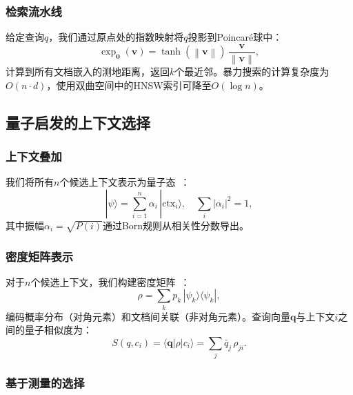 \documentclass[a4paper,11pt]{ctexart}
\newcommand{\norm}[1]{\left\|#1\right\|}
\newcommand{\abs}[1]{\left|#1\right|}
\newcommand{\ket}[1]{|#1\rangle}
\newcommand{\bra}[1]{\langle #1|}
\begin{document}
\subsubsection{检索流水线}

给定查询$q$，我们通过原点处的指数映射将$q$投影到Poincar\'{e}球中：
\begin{equation}
  \exp_{\mathbf{0}}(\mathbf{v}) =
    \tanh(\norm{\mathbf{v}})\,
    \frac{\mathbf{v}}{\norm{\mathbf{v}}},
  \label{eq:expmap}
\end{equation}
计算到所有文档嵌入的测地距离，返回$k$个最近邻。暴力搜索的计算复杂度为$O(n \cdot d)$，使用双曲空间中的HNSW索引可降至$O(\log n)$。

\subsection{量子启发的上下文选择}
\label{sec:quantum}

\subsubsection{上下文叠加}

我们将所有$n$个候选上下文表示为量子态~\cite{vanrijsbergen2004}：
\begin{equation}
  \ket{\psi} = \sum_{i=1}^{n} \alpha_i\, \ket{\mathrm{ctx}_i},
  \quad
  \sum_{i} \abs{\alpha_i}^{2} = 1,
  \label{eq:superposition}
\end{equation}
其中振幅$\alpha_i = \sqrt{P(i)}$通过Born规则从相关性分数导出。

\subsubsection{密度矩阵表示}

对于$n$个候选上下文，我们构建密度矩阵~\cite{zuccon2009}：
\begin{equation}
  \rho = \sum_{k} p_k\, \ket{\psi_k}\bra{\psi_k},
  \label{eq:density}
\end{equation}
编码概率分布（对角元素）和文档间关联（非对角元素）。查询向量$\mathbf{q}$与上下文$i$之间的量子相似度为：
\begin{equation}
  S(q, c_i) = \bra{\mathbf{q}}\rho\ket{c_i}
            = \sum_{j} \bar{q}_j\, \rho_{ji}.
  \label{eq:qsim}
\end{equation}

\subsubsection{基于测量的选择}
\end{document}
